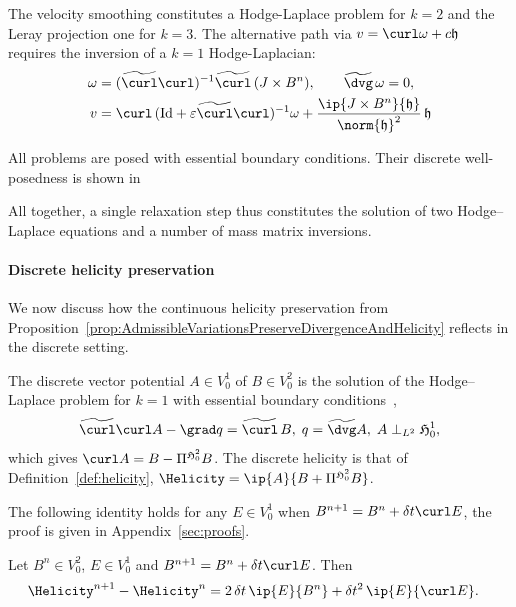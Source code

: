 \documentclass[%
 reprint,
 superscriptaddress,
 amsmath,amssymb,
 aps, nofootinbib, floatfix]{revtex4-2}
\begin{document}
The velocity smoothing constitutes a Hodge-Laplace problem for $k = 2$ and the Leray projection one for $k = 3$. The alternative path via $v = \curl \omega + c \mathfrak h$ requires the inversion of a $k=1$ Hodge-Laplacian:
\begin{align}
    \omega &= (\widetilde{\curl} \curl)^{-1} \widetilde{\curl} \, (J \times B^n), \qquad \widetilde{\dvg} \, \omega = 0, \\
    v &= \curl \, (\mathrm{Id} + \varepsilon \widetilde{\curl} \curl)^{-1} \omega + \frac{\ip{J \times B^n}{\mathfrak h}}{\norm{\mathfrak h}^2} \, \mathfrak h
\end{align}

All problems are posed with essential boundary conditions. Their discrete well-posedness is shown in~\citep[Sections 6.2.2--4]{arnold_finite_2010}

All together, a single relaxation step thus constitutes the solution of two Hodge--Laplace equations and a number of mass matrix inversions.

\paragraph{Discrete helicity preservation}
We now discuss how the continuous helicity preservation from Proposition~\ref{prop:AdmissibleVariationsPreserveDivergenceAndHelicity} reflects in the discrete setting.
\begin{definition}
    \label{def:discrete_helicity}
    The discrete vector potential $A \in V^1_0$ of $B \in V^2_0$ is the solution of the Hodge--Laplace problem for $k = 1$ with essential boundary conditions~\citep[Section 6.2.2]{arnold_finite_2010},
\begin{align}
    \label{eq:laplace_1_0}
    \widetilde{\curl} \curl A - \grad q = \widetilde{\curl} \, B, \; q = \widetilde{\dvg} A, \; A \perp_{L^2} {\mathfrak H}^1_0,   
\end{align}
    which gives $\curl A = B - \Pi^{\mathfrak H^2_0} B$. The discrete helicity is that of Definition~\ref{def:helicity}, $\Helicity = \ip{A}{B + \Pi^{\mathfrak H^2_0} B}$.
\end{definition}

The following identity holds for any $E \in V^1_0$ when $B^{n+1} = B^n + \delta t \curl E$, the proof is given in Appendix~\ref{sec:proofs}.

\begin{lemma}
\label{lem:helicity_balance}
    Let $B^n \in V^2_0$, $E \in V^1_0$ and $B^{n+1} = B^n + \delta t \curl E$. Then
    \begin{align}
        \label{eq:helicity_balance}
        \Helicity^{n+1} - \Helicity^{n} &= 2 \, \delta t \, \ip{E}{B^{n}} + \delta t^2 \, \ip{E}{\curl E}.
    \end{align}
\end{lemma}
\end{document}
